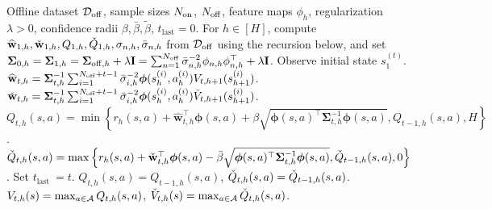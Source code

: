 \begin{algorithm}[htbp]
    \caption{Unabridged Offline-to-Online Hybrid RL (Algorithm~\ref{alg:ch02-alg3})}
    \label{alg:ch02-hyrule-full}
    \begin{algorithmic}[1]
         Offline dataset $\gD_{\off}$, sample sizes $N_{\on}$, $N_{\off}$, feature maps $\phi_h$, regularization $\lambda>0$, confidence radii $\beta, \bar\beta, \tilde\beta$, $t_{\text{last}}=0$.
         For $h \in [H]$, compute $\widehat{\mathbf{w}}_{1, h}, \widecheck{\mathbf{w}}_{1, h}, Q_{1,h}, \widecheck{Q}_{1,h}, \sigma_{n,h}, \bar{\sigma}_{n,h}$ from $\gD_{\off}$ using the recursion below, and set $\boldsymbol{\Sigma}_{0, h}=\boldsymbol{\Sigma}_{1, h}=\boldsymbol{\Sigma}_{\off, h} + \lambda\mathbf{I} = \sum_{n=1}^{N_{\off}}\bar{\sigma}_{n,h}^{-2}\phi_{n,h}\phi_{n,h}^{\top}+\lambda\mathbf{I}$.
            \State Observe initial state $s_{1}^{(t)}$.
                \State $\widehat{\mathbf{w}}_{t, h}=\mathbf{\Sigma}_{t, h}^{-1} \sum_{i=1}^{N_{\off}+t-1} \bar{\sigma}_{i, h}^{-2} \boldsymbol{\phi}(s_h^{(i)}, a_h^{(i)}) V_{t, h+1}(s_{h+1}^{(i)})$.
                \State $\widecheck{\mathbf{w}}_{t, h}=\boldsymbol{\Sigma}_{t, h}^{-1} \sum_{i=1}^{N_{\off}+t-1} \bar{\sigma}_{i, h}^{-2} \boldsymbol{\phi}(s_h^{(i)}, a_h^{(i)}) \widecheck{V}_{t, h+1}(s_{h+1}^{(i)})$.
                    \State $Q_{t, h}(s, a)=\min \left\{r_h(s, a)+\widehat{\mathbf{w}}_{t, h}^{\top} \boldsymbol{\phi}(s, a)+\beta \sqrt{\boldsymbol{\phi}(s, a)^{\top} \boldsymbol{\Sigma}_{t, h}^{-1} \boldsymbol{\phi}(s, a)}, Q_{t-1, h}(s, a), H\right\}$.
                    \State $\widecheck{Q}_{t, h}(s, a)=\max \left\{r_h(s, a)+\widecheck{\mathbf{w}}_{t, h}^{\top} \boldsymbol{\phi}(s, a)-\bar{\beta} \sqrt{\boldsymbol{\phi}(s, a)^{\top} \boldsymbol{\Sigma}_{t, h}^{-1} \boldsymbol{\phi}(s, a)}, \widecheck{Q}_{t-1, h}(s, a), 0\right\}$.
                    \State Set $t_{\text {last }}=t$.
                \Else
                    \State $Q_{t, h}(s, a)=Q_{t-1, h}(s, a)$, $\widecheck{Q}_{t, h}(s, a)=\widecheck{Q}_{t-1, h}(s, a)$.
                \EndIf
                \State $V_{t, h}(s)=\max_{a \in \gA} Q_{t, h}(s, a)$, $\widecheck V_{t, h}(s)=\max_{a \in \gA} \widecheck Q_{t, h}(s, a)$.
            \EndFor

\end{algorithmic}
\end{algorithm}
